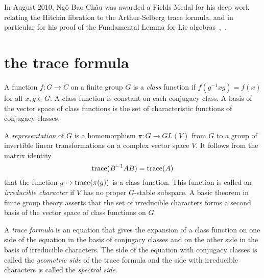 \def\gg{\frak{g}}
\def\cc{\frak{c}}
\def\AA{{\mathcal A}}
\def\MM{{\mathcal M}}
\def\OO{{\mathcal O}}
\def\XX{$\langle\text{\it insert}\rangle$}

In August 2010, Ng\^o Bao Ch\^au was awarded a Fields Medal for his
deep work relating the Hitchin fibration to the Arthur-Selberg trace
formula, and in particular for his proof of the Fundamental Lemma for
Lie algebras~\cite{NBC:2006},~\cite{NBC:2010}.


\section{the trace formula}

A function $f:G\to\ring{C}$ on a finite group $G$ is a {\it class} function
if $f(g^{-1} x g) = f(x)$ for all $x,g\in G$.  A class
function is constant on each conjugacy class.  A basis of the
vector space of class functions is the set of characteristic functions
of conjugacy classes.

A {\it representation} of $G$ is a homomorphism $\pi:G\to GL(V)$ from $G$
to a group of invertible linear transformations on a complex vector
space $V$.  It follows from the matrix identity 
\[
{\operatorname{trace}}( B^{-1} A B) = {\operatorname{trace}} (A)
\]
that the function $g\mapsto {\operatorname{trace}}(\pi(g))$
is a class function.  This function is called an
{\it irreducible character} if $V$ has no proper $G$-stable subspace.
A basic theorem in finite group theory asserts that the set of
irreducible characters forms a second basis of the vector space of
class functions on $G$. 

A {\it trace formula} is an equation that gives the expansion of a
class function on one side of the equation in the basis of conjugacy
classes and on the other side in the basis of irreducible characters.
The side of the equation with conjugacy classes is called the {\it
  geometric side} of the trace formula and the side with irreducible
characters is called the {\it spectral side}.

